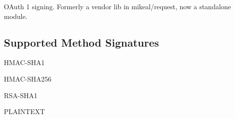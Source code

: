 O\+Auth 1 signing. Formerly a vendor lib in mikeal/request, now a standalone module.

\subsection*{Supported Method Signatures}


\begin{DoxyItemize}
\item H\+M\+A\+C-\/\+S\+H\+A1
\item H\+M\+A\+C-\/\+S\+H\+A256
\item R\+S\+A-\/\+S\+H\+A1
\item P\+L\+A\+I\+N\+T\+E\+XT 
\end{DoxyItemize}